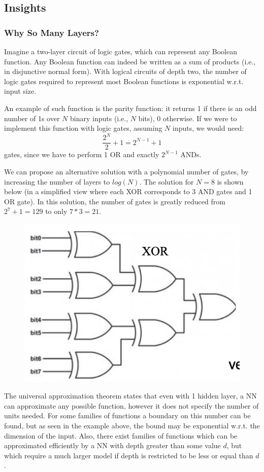 \subsection{Insights}

\subsubsection{Why So Many Layers?}

Imagine a two-layer circuit of logic gates, which can represent any Boolean function. Any Boolean function can indeed be written as a sum of products (i.e., in disjunctive normal form). With logical circuits of depth two, the number of logic gates required to represent most Boolean functions is exponential w.r.t. input size.

An example of such function is the parity function: it returns 1 if there is an odd number of 1s over $N$ binary inputs (i.e., $N$ bits), 0 otherwise. If we were to implement this function with logic gates, assuming $N$ inputs, we would need:
\begin{equation*}
    \dfrac{2^N}{2} + 1 = 2^{N-1} + 1
\end{equation*}
gates, since we have to perform 1 OR and exactly $2^{N-1}$ ANDs.

We can propose an alternative solution with a polynomial number of gates, by increasing the number of layers to $log(N)$. The solution for $N=8$ is shown below (in a simplified view where each XOR corresponds to 3 AND gates and 1 OR gate). In this solution, the number of gates is greatly reduced from $2^7 + 1 = 129$ to only $7 * 3 = 21$.
\begin{figure}[h]
    \centering
    \includegraphics[width=0.5\linewidth]{img/Circuit_deep.png}
\end{figure}

The universal approximation theorem states that even with 1 hidden layer, a NN can approximate any possible function, however it does not specify the number of units needed. For some families of functions a boundary on this number can be found, but as seen in the example above, the bound may be exponential w.r.t. the dimension of the input. Also, there exist families of functions which can be approximated efficiently by a NN with depth greater than some value $d$, but which require a much larger model if depth is restricted to be less or equal than $d$.

